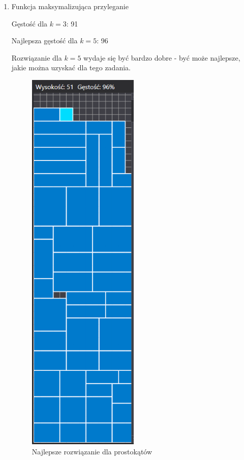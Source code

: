 \documentclass{article}
\begin{document}
\begin{enumerate}
\item Funkcja maksymalizująca przyleganie

Gęstość dla $k=3$: 91

Najlepsza gęstość dla $k=5$: 96

Rozwiązanie dla $k=5$ wydaje się być bardzo dobre - być może najlepsze, jakie można uzyskać dla tego zadania.
\begin{figure}[H]
\hspace*{3.5cm}
\includegraphics[width=5.3cm]{prostokaty.PNG}
\caption{Najlepsze rozwiązanie dla prostokątów}
\end{figure}

\end{enumerate}
\end{document}
